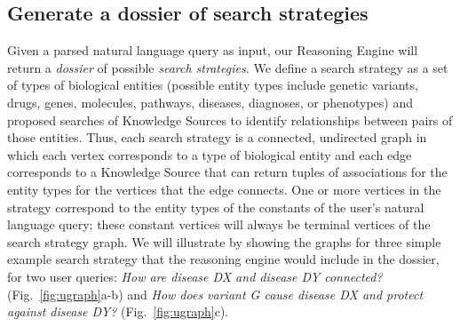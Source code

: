 \documentclass[11pt,notitlepage]{article}
\begin{document}
\subsection{Generate a dossier of search strategies}
\label{section:strategies}
Given a parsed natural language query as input, our Reasoning Engine will return
a {\em dossier\/} of possible {\em search strategies.\/} We define a search
strategy as a set of types of biological entities (possible entity types include
genetic variants, drugs, genes, molecules, pathways, diseases, diagnoses, or
phenotypes) and proposed searches of Knowledge Sources to identify relationships
between pairs of those entities. Thus, each search strategy is a connected,
undirected graph in which each vertex corresponds to a type of biological entity
and each edge corresponds to a Knowledge Source that can return tuples of
associations for the entity types for the vertices that the edge connects.  One
or more vertices in the strategy correspond to the entity types of the constants
of the user's natural language query; these constant vertices will always be
terminal vertices of the search strategy graph. We will illustrate by showing
the graphs for three simple example search strategy that the reasoning engine
would include in the dossier, for two user queries: {\em How are disease DX and
disease DY connected?\/} (Fig.~\ref{fig:ugraph}a-b) and {\em How does variant G
cause disease DX and protect against disease DY?\/} (Fig.~\ref{fig:ugraph}c).
\end{document}
